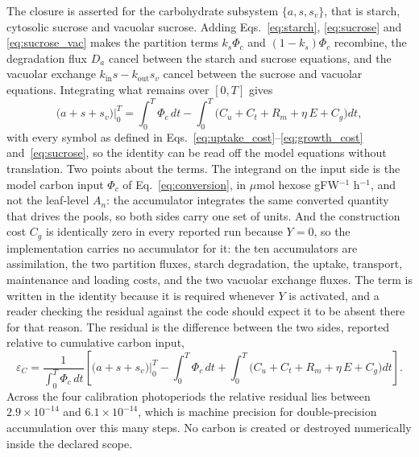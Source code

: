 The closure is asserted for the carbohydrate subsystem
$\{a, s, s_v\}$, that is starch, cytosolic sucrose and vacuolar sucrose. Adding
Eqs.~\eqref{eq:starch}, \eqref{eq:sucrose} and \eqref{eq:sucrose_vac} makes the
partition terms $k_s \Phi_c$ and $(1-k_s)\Phi_c$ recombine, the degradation flux
$D_a$ cancel between the starch and sucrose equations, and the vacuolar exchange
$k_{\mathrm{in}} s - k_{\mathrm{out}} s_v$ cancel between the sucrose and
vacuolar equations. Integrating what remains over $[0,T]$ gives
\begin{equation}
\bigl(a + s + s_v\bigr)\Big|_0^{T}
=
\int_0^{T} \Phi_c \, dt
-
\int_0^{T}
\bigl( C_u + C_t + R_m + \eta\,E + C_g \bigr) dt ,
\label{eq:budget}
\end{equation}
with every symbol as defined in Eqs.~\eqref{eq:uptake_cost}--\eqref{eq:growth_cost}
and~\eqref{eq:sucrose}, so
the identity can be read off the model equations without translation. Two points
about the terms. The integrand on the input side is the model carbon input
$\Phi_c$ of Eq.~\eqref{eq:conversion}, in $\mu$mol hexose gFW$^{-1}$ h$^{-1}$,
and not the leaf-level $A_n$: the accumulator integrates the same converted
quantity that drives the pools, so both sides carry one set of units. And the construction
cost $C_g$ is identically zero in every reported run because $Y = 0$, so the
implementation carries no accumulator for it: the ten accumulators are
assimilation, the two partition fluxes, starch degradation, the uptake,
transport, maintenance and loading costs, and the two vacuolar exchange fluxes.
The term is written in the identity because it is required whenever $Y$ is
activated, and a reader checking the residual against the code should expect it
to be absent there for that reason. The residual is the difference between the two sides, reported
relative to cumulative carbon input,
\begin{equation}
\varepsilon_{C}
=
\frac{1}{\int_0^{T} \Phi_c \, dt}
\left[
\bigl(a + s + s_v\bigr)\Big|_0^{T}
-
\int_0^{T} \Phi_c \, dt
+
\int_0^{T}
\bigl( C_u + C_t + R_m + \eta\,E + C_g \bigr) dt
\right].
\label{eq:residual}
\end{equation}
Across the four calibration photoperiods the relative residual lies between
$2.9\times10^{-14}$ and $6.1\times10^{-14}$, which is machine precision for
double-precision accumulation over this many steps. No carbon is created or
destroyed numerically inside the declared scope.

